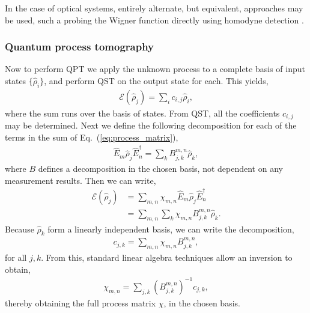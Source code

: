 In the case of optical systems, entirely alternate, but equivalent, approaches may be used, such a probing the Wigner function directly using homodyne detection \cite{???}.

%
%

\subsubsection{Quantum process tomography} 

Now to perform QPT we apply the unknown process to a complete basis of input states $\{\hat\rho_i\}$, and perform QST on the output state for each. This yields,
\begin{align}
\mathcal{E}(\hat\rho_j) = \sum_{i} c_{i,j} \hat\rho_i,
\end{align}
where the sum runs over the basis of states. From QST, all the coefficients $c_{i,j}$ may be determined. Next we define the following decomposition for each of the terms in the sum of Eq.~(\ref{eq:process_matrix}),
\begin{align}
\hat{E}_m \hat\rho_j \hat{E}_n^\dag = \sum_k B^{m,n}_{j,k} \hat\rho_k,
\end{align}
where $B$ defines a decomposition in the chosen basis, not dependent on any measurement results. Then we can write,
\begin{align}
\mathcal{E}(\hat\rho_j) &= \sum_{m,n} \chi_{m,n} \hat{E}_m\hat\rho_j\hat{E}_n^\dag \nonumber \\
&= \sum_{m,n} \sum_k \chi_{m,n} B^{m,n}_{j,k} \hat\rho_k.
\end{align}
Because $\hat\rho_k$ form a linearly independent basis, we can write the decomposition,
\begin{align}
c_{j,k} = \sum_{m,n} \chi_{m,n} B_{j,k}^{m,n},
\end{align}
for all \mbox{$j,k$}. From this, standard linear algebra techniques allow an inversion to obtain,
\begin{align}
\chi_{m,n} = \sum_{j,k} (B_{j,k}^{m,n})^{-1} c_{j,k},
\end{align}
thereby obtaining the full process matrix $\chi$, in the chosen basis.